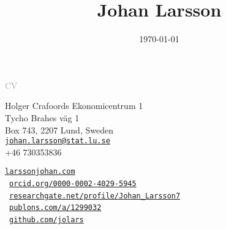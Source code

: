 \documentclass[
  10pt,
  headsepline=true,
  english,
  DIV=12
]{scrartcl}
\date{\today}
\title{Johan Larsson}
\renewcommand*{%
  \mkbibnamegiven
}[1]{\ifitemannotation{highlight}{\textbf{#1}}{#1}}
\renewcommand*{%
  \mkbibnamefamily
}[1]{\ifitemannotation{highlight}{\textbf{#1}}{#1}}
\begin{document}
\begin{titlepage}
\end{titlepage}

\begin{center}
  {\large \textcolor{darkgray}{CV}}
  \medskip

  \smallskip

  \noindent {\large \today}
\end{center}

\baselineskip

\begin{minipage}[t]{.5\textwidth}
  \small
  \noindent
  Holger Crafoords Ekonomicentrum 1\\
  Tycho Brahes väg 1\\
  Box 743, 2207 Lund, Sweden
  \vspace{1ex}\\
  \href{mailto:johan.larsson@stat.lu.se}{\nolinkurl{johan.larsson@stat.lu.se}}\\
  +46 730353836

\end{minipage}%
\begin{minipage}[t]{0.5\textwidth}
  \raggedleft\small
  \href{https://larssonjohan.com}{\nolinkurl{larssonjohan.com}}\\
  {\aiOrcid}\,
  \href{https://orcid.org/0000-0002-4029-5945}{\nolinkurl{orcid.org/0000-0002-4029-5945}}\\
  {\aiResearchGate}\,
  \href{https://www.researchgate.net/profile/Johan_Larsson7}{\nolinkurl{researchgate.net/profile/Johan\_Larsson7}}\\
  {\aiPublons}\,
  \href{https://publons.com/a/1299032}{\nolinkurl{publons.com/a/1299032}}\\
  {\faGithub}\, \href{https://github.com/jolars}{\nolinkurl{github.com/jolars}}
\end{minipage}
\end{document}

